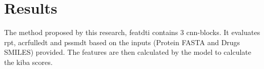 \section{Results}

The method proposed by this research, \acrfull{featdti} contains 3 \acrfull{cnn}-blocks. It evaluates \acrfull{rpt}, acrfull{edt} and \acrfull{pssmdt} based on the inputs (Protein FASTA and Drugs SMILES) provided. The features are then calculated by the model to calculate the \acrfull{kiba} scores.


